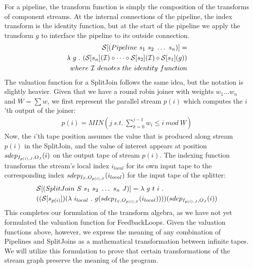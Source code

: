 For a pipeline, the transform function is simply the composition of the
transforms of component streams.  At the internal connections of the
pipeline, the index transform is the identity function, but at the start
of the pipeline we apply the transform $g$ to interface the pipeline to
its outside connection.
\begin{align*}
{\cal S} [(Pipeline~s_1~s_2~\dots~s_n)] = \\
\la~g~.~({\cal S}[s_n]({\cal I}) \circ \dots \circ {\cal S}[s_2]({\cal I}) \circ {\cal S}[s_1](g)) \\
where~{\cal I}~denotes~the~identity~function
\end{align*}
The valuation function for a SplitJoin follows the same idea, but the
notation is slightly heavier.  Given that we have a round robin joiner
with weights $w_1 \dots w_n$ and $W = \sum{w}$, we first represent the
parallel stream $p(i)$ which computes the $i$'th output of the
joiner:
\begin{align}
\label{eq:p}
p(i) = MIN(j~s.t.~\sum_{k=0}^{j-1}{w_i} \le i~mod~W)
\end{align}
Now, the $i$'th tape position assumes the value that is produced along
stream $p(i)$ in the SplitJoin, and the value of interest appears at
position $sdep_{I_{p(i),J}, O_J}(i)$ on the output tape of stream $p(i)$.
The indexing function transforms the stream's local index $i_{local}$
for its own input tape to the corresponding index
$sdep_{I_S, O_{p(i),S}}(i_{local})$ for the input tape of the splitter:
\begin{align*}
&{\cal S} [(SplitJoin~S~s_1~s_2~\dots~s_n~J)] = \la~g~t~i~.~ \\
&(({\cal S}[s_{p(i)}])(\la~i_{local}~.~g(\mi{I_S}{O_{p(i),S}}(i_{local}))))(\mi{I_{p(i),J}}{O_J}(i))
\end{align*}
This completes our formulation of the transform algebra, as we have
not yet formulated the valuation function for FeedbackLoops.  Given
the valuation functions above, however, we express the meaning of any
combination of Pipelines and SplitJoins as a mathematical
transformation between infinite tapes.  We will utilize this
formulation to prove that certain transformations of the stream graph
preserve the meaning of the program.

